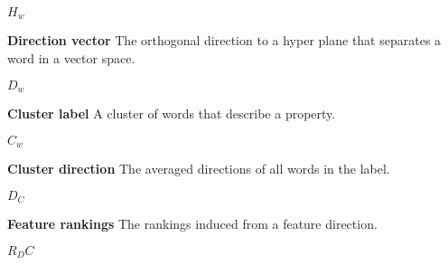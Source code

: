 \begin{acronym}
$H_w$

\textbf{Direction vector} The orthogonal direction to a hyper plane that separates a word in a vector space. 

$D_w$

\textbf{Cluster label} A cluster of words that describe a property.

$C_w$

\textbf{Cluster direction} The averaged directions of all words in the label.

$D_C$

\textbf{Feature rankings} The rankings induced from a feature direction.

$R_DC$

\end{acronym}


